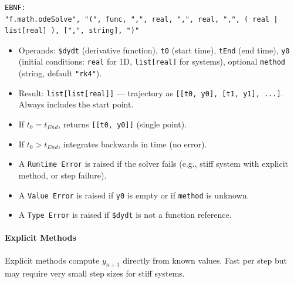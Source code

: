 \begin{verbatim}
EBNF:
"f.math.odeSolve", "(", func, ",", real, ",", real, ",", ( real | list[real] ), [",", string], ")"
\end{verbatim}
\begin{itemize}
\item Operands: \texttt{\$dydt} (derivative function), \texttt{t0} (start time), \texttt{tEnd} (end time), \texttt{y0} (initial conditions: \texttt{real} for 1D, \texttt{list[real]} for systems), optional \texttt{method} (string, default \texttt{"rk4"}).
\item Result: \texttt{list[list[real]]} --- trajectory as \texttt{[[t0, y0], [t1, y1], ...]}. Always includes the start point.
\item If $t_0 = t_{End}$, returns \texttt{[[t0, y0]]} (single point).
\item If $t_0 > t_{End}$, integrates backwards in time (no error).
\item A \texttt{Runtime Error} is raised if the solver fails (e.g., stiff system with explicit method, or step failure).
\item A \texttt{Value Error} is raised if \texttt{y0} is empty or if \texttt{method} is unknown.
\item A \texttt{Type Error} is raised if \texttt{\$dydt} is not a function reference.
\end{itemize}

\paragraph{Explicit Methods}
Explicit methods compute $y_{n+1}$ directly from known values. Fast per step but may require very small step sizes for stiff systems.

